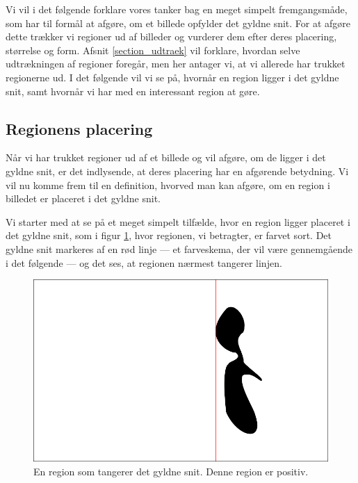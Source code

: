 {
\def\imgscale{0.34}

\textsf{Vi vil i det følgende forklare vores tanker bag en meget simpelt
fremgangsmåde, som har til formål at afgøre, om et billede opfylder det
gyldne snit. For at afgøre dette trækker vi regioner ud af billeder og
vurderer dem efter deres placering, størrelse og form. Afsnit
\ref{section_udtraek} vil forklare, hvordan selve udtrækningen af
regioner foregår, men her antager vi, at vi allerede har trukket
regionerne ud. I det følgende vil vi se på, hvornår en region ligger i
det gyldne snit, samt hvornår vi har med en interessant region at gøre.
}

\subsection{Regionens placering}
Når vi har trukket regioner ud af et billede og vil afgøre, om de ligger
i det gyldne snit, er det indlysende, at deres placering har en afgørende
betydning.  Vi vil nu komme frem til en definition, hvorved man kan
afgøre, om en region i billedet er placeret i det gyldne snit.

Vi starter med at se på et meget simpelt tilfælde, hvor en region ligger
placeret i det gyldne snit, som i figur \ref{pos_naiv_1}, hvor regionen,
vi betragter, er farvet sort.  Det gyldne snit markeres af en rød linje
--- et farveskema, der vil være gennemgående i det følgende --- og det
ses, at regionen nærmest tangerer linjen.

\begin{figure}[h]
    \begin{center}
        \includegraphics[scale=\imgscale,angle=0]{afsnit/vores_implementation/billeder/naiv_algoritme/naiv_positiv_blob_1}
    \end{center}
    \caption[En positiv region]{En region som tangerer det gyldne snit.
    Denne region er positiv.}
    \label{pos_naiv_1}
\end{figure}

}
